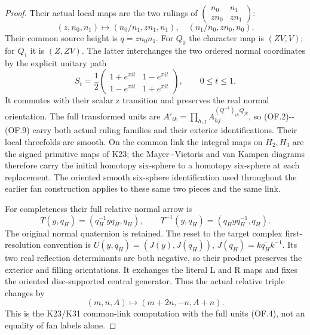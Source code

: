 \begin{proof}
Their actual local maps are the two rulings of
\(\left(\begin{smallmatrix}n_0&n_1\\zn_0&zn_1\end{smallmatrix}\right)\):
\[
 (z,n_0,n_1)\longmapsto
 (n_0/n_1,zn_1,n_1),
 \quad(n_1/n_0,zn_0,n_0).                           \tag{OF.16}
\]
Their common source height is \(q=zn_0n_1\).
For \(Q_0\) the character map is \((ZV,V)\); for
\(Q_1\) it is \((Z,ZV)\). The latter interchanges
the two ordered normal coordinates by the explicit
unitary path
\[
 S_t=\frac12\begin{pmatrix}
 1+e^{\pi it}&1-e^{\pi it}\\
 1-e^{\pi it}&1+e^{\pi it}
 \end{pmatrix},\qquad 0\le t\le1.
\]
It commutes with their scalar z transition and preserves
the real normal orientation. The full transformed units
are \(A'_{ik}=\prod_{h,j}A_{hj}^{(Q^{-1})_{ih}Q_{jk}}\),
so (OF.2)-\/-(OF.9) carry both actual ruling families and
their exterior identifications. Their local threefolds
are smooth. On the common link the integral maps on
\(H_2,H_3\) are the signed primitive maps of K23; the
Mayer-\/-Vietoris and van Kampen diagrams therefore carry
the initial homotopy six-sphere to a homotopy six-sphere
at each replacement. The oriented smooth six-sphere
identification used throughout the earlier fan construction
applies to these same two pieces and the same link.

For completeness their full relative normal arrow is
\[
 T(y,q_H)=(q_H^{-1}yq_H,q_H),\qquad
 T^{-1}(y,q_H)=(q_Hyq_H^{-1},q_H).
\]
The original normal quaternion is retained. The reset
to the target complex first-resolution convention is
\(U(y,q_H)=(J(y),J(q_H))\),
\(J(q_H)=k\overline{q_H}k^{-1}\). Its two real
reflection determinants are both negative, so their
product preserves the exterior and filling orientations.
It exchanges the literal L and R maps and fixes the
oriented disc-supported central generator. Thus the
actual relative triple changes by
\[
 (m,n,A)\longmapsto(m+2n,-n,A+n).                  \tag{OF.17}
\]
This is the K23/K31 common-link computation with the
full units (OF.4), not an equality of fan labels alone.


\end{proof}
